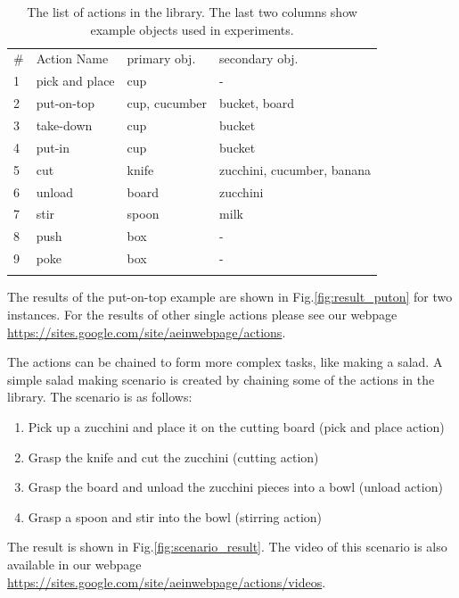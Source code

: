 \begin{table}
\centering
\caption{The list of actions in the library. The last two columns show example objects used in experiments.}
\label{tab:action_list}       %
\begin{tabular}{llll}
\hline\noalign{\smallskip}
\# & Action Name & primary obj. & secondary obj. \\
\noalign{\smallskip}\hline\noalign{\smallskip}
1 & pick and place  & cup & - \\
2 & put-on-top & cup, cucumber & bucket, board \\ 
3 & take-down  & cup & bucket \\
4 & put-in  & cup & bucket \\
5 & cut  & knife & zucchini, cucumber, banana \\
6 & unload  & board & zucchini \\
7 & stir  & spoon & milk \\
8 & push  & box & - \\
9 & poke  & box & -\\
\noalign{\smallskip}\hline
\end{tabular}
\end{table}

The results of the put-on-top example are shown in Fig.\ref{fig:result_puton} for two instances.
For the results of other single actions please see our webpage \url{https://sites.google.com/site/aeinwebpage/actions}.

The actions can be chained to form more complex tasks, like making a salad.
A simple salad making scenario is created by chaining some of the actions in the library.
The scenario is as follows:
\begin{enumerate}
 \item Pick up a zucchini and place it on the cutting board (pick and place action)
 \item Grasp the knife and cut the zucchini (cutting action)
 \item Grasp the board and unload the zucchini pieces into a bowl (unload action)
 \item Grasp a spoon and stir into the bowl (stirring action)
\end{enumerate}

The result is shown in Fig.\ref{fig:scenario_result}.
The video of this scenario is also available in our webpage \url{https://sites.google.com/site/aeinwebpage/actions/videos}.



